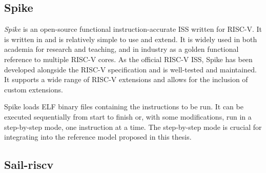 \subsection{Spike}
\label{sec:spike}

\textit{Spike} \cite{SpikeRISCVISA2023} is an open-source functional instruction-accurate ISS written for RISC-V. It is written in \cpp and is relatively simple to use and extend. It is widely used in both academia for research and teaching, and in industry as a golden functional reference to multiple RISC-V cores. As the official RISC-V ISS, Spike has been developed alongside the RISC-V specification and is well-tested and maintained. It supports a wide range of RISC-V extensions and allows for the inclusion of custom extensions.

Spike loads ELF binary files containing the instructions to be run. It can be executed sequentially from start to finish or, with some modifications, run in a step-by-step mode, one instruction at a time. The step-by-step mode is crucial for integrating into the reference model proposed in this thesis.








\subsection{Sail-riscv}
\label{sec:sail}


